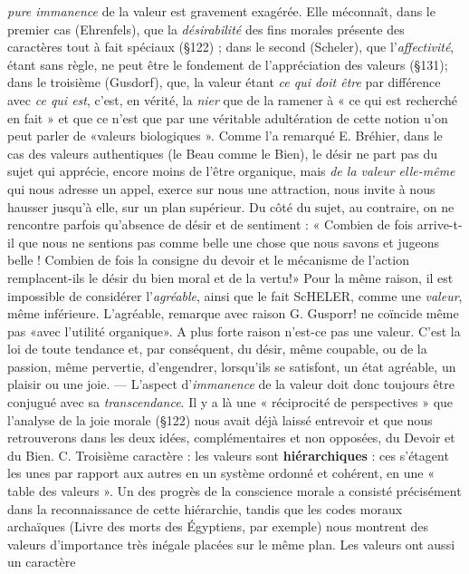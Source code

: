 {\it pure immanence} de la valeur est gravement exagérée. Elle méconnaît,
dans le premier cas (Ehrenfels), que la {\it désirabilité} des fins morales
présente des caractères tout à fait spéciaux (\S 122) ; dans le second
(Scheler), que l’{\it affectivité}, étant sans règle, ne peut être le fondement
de l'appréciation des valeurs (\S 131); dans le troisième (Gusdorf),
que, la valeur étant {\it ce qui doit être} par différence avec {\it ce qui est}, c’est,
en vérité, la {\it nier} que de la ramener à « ce qui est recherché en fait »
et que ce n’est que par une véritable adultération de cette notion
u’on peut parler de «valeurs biologiques ». Comme l’a remarqué
E. Bréhier, dans le cas des valeurs authentiques (le Beau comme
le Bien), le désir ne part pas du sujet qui apprécie, encore moins
de l’être organique, mais {\it de la valeur elle-même} qui nous adresse
un appel, exerce sur nous une attraction, nous invite à nous hausser
jusqu’à elle, sur un plan supérieur. Du côté du sujet, au contraire,
on ne rencontre parfois qu’absence de désir et de sentiment : « Combien
de fois arrive-t-il que nous ne sentions pas comme belle une
chose que nous savons et jugeons belle ! Combien de fois la consigne du
devoir et le mécanisme de l’action remplacent-ils le désir du bien
moral et de la vertu!» Pour la même raison, il est impossible de
considérer l’{\it agréable}, ainsi que le fait ScHELER, comme une {\it valeur},
même inférieure. L’agréable, remarque avec raison G. Gusporr! ne
coïncide même pas «avec l'utilité organique». A plus forte raison
n'est-ce pas une valeur. C’est la loi de toute tendance et, par conséquent,
du désir, même coupable, ou de la passion, même pervertie,
d’engendrer, lorsqu'ils se satisfont, un état agréable, un plaisir ou
une joie. — L'aspect d’{\it immanence} de la valeur doit donc toujours être
conjugué avec sa {\it transcendance}. Il y a là une « réciprocité de perspectives »
que l’analyse de la joie morale (\S 122) nous avait déjà
laissé entrevoir et que nous retrouverons dans les deux idées, complémentaires
et non opposées, du Devoir et du Bien.
C. Troisième caractère : les valeurs sont {\bf hiérarchiques} : ces
s’étagent les unes par rapport aux autres en un système ordonné et
cohérent, en une « table des valeurs ». Un des progrès de la conscience
morale a consisté précisément dans la reconnaissance de cette
hiérarchie, tandis que les codes moraux archaïques (Livre des morts des
Égyptiens, par exemple) nous montrent des valeurs d'importance
très inégale placées sur le même plan. Les valeurs ont aussi un caractère
